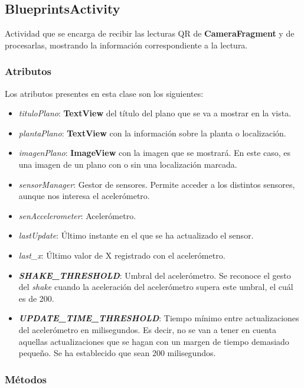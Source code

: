 \documentclass[11pt,a4paper]{article}
\begin{document}
\subsection{\textbf{BlueprintsActivity}}
\label{sec:blue}

Actividad que se encarga de recibir las lecturas QR de \textbf{CameraFragment} y de procesarlas, mostrando la información
correspondiente a la lectura.

\subsubsection{Atributos}
Los atributos presentes en esta clase son los siguientes:

\begin{itemize}
    \item \textit{tituloPlano}: \textbf{TextView} del título del plano que se va a mostrar en la vista.
    \item \textit{plantaPlano}: \textbf{TextView} con la información sobre la planta o localización.
    \item \textit{imagenPlano}: \textbf{ImageView} con la imagen que se mostrará. En este caso, es una imagen de un plano con o
    sin una localización marcada.
    \item \textit{sensorManager}: Gestor de sensores. Permite acceder a los distintos sensores, aunque nos interesa el acelerómetro.
    \item \textit{senAccelerometer}: Acelerómetro.
    \item \textit{lastUpdate}: Último instante en el que se ha actualizado el sensor.
    \item \textit{last\_x}: Último valor de X registrado con el acelerómetro.
    \item \textit{\textbf{SHAKE\_THRESHOLD}}: Umbral del acelerómetro. Se reconoce el gesto del \textit{shake} cuando la aceleración
    del acelerómetro supera este umbral, el cuál es de 200.
    \item \textit{\textbf{UPDATE\_TIME\_THRESHOLD}}: Tiempo mínimo entre actualizaciones del acelerómetro en milisegundos. Es decir,
    no se van a tener en cuenta aquellas actualizaciones que se hagan con un margen de tiempo demasiado pequeño. Se ha establecido
    que sean 200 milisegundos.
\end{itemize}

\subsubsection{Métodos}
\end{document}
